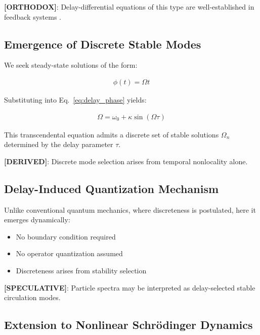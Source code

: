         \textbf{[ORTHODOX]}: Delay-differential equations of this type are well-established in feedback systems \cite{SST_delay_basic}.
    
    \subsection{Emergence of Discrete Stable Modes}
        
        We seek steady-state solutions of the form:
        
        \begin{align}
            \phi(t) = \Omega t
        \end{align}
        
        Substituting into Eq.~\ref{eq:delay_phase} yields:
        
        \begin{align}
            \Omega = \omega_0 + \kappa \sin(\Omega \tau)
            \label{eq:mode_condition}
        \end{align}
        
        This transcendental equation admits a discrete set of stable solutions $\Omega_n$ determined by the delay parameter $\tau$.
        
        \textbf{[DERIVED]}: Discrete mode selection arises from temporal nonlocality alone.
    
    \subsection{Delay-Induced Quantization Mechanism}
        
        Unlike conventional quantum mechanics, where discreteness is postulated, here it emerges dynamically:
        
        \begin{itemize}
            \item No boundary condition required
            \item No operator quantization assumed
            \item Discreteness arises from stability selection
        \end{itemize}
        
        \textbf{[SPECULATIVE]}: Particle spectra may be interpreted as delay-selected stable circulation modes.
    
    \subsection{Extension to Nonlinear Schrödinger Dynamics}
        
